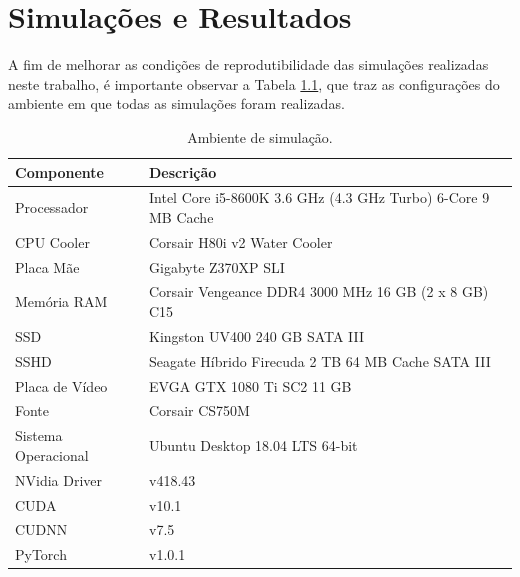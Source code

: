 \chapter{Simulações e Resultados}
\label{cha:results}

A fim de melhorar as condições de reprodutibilidade das simulações realizadas neste trabalho, é importante observar a Tabela \ref{tab:results_pc_specs}, que traz as configurações do ambiente em que todas as simulações foram realizadas.

\begin{table}[H]
    \centering
    \caption{Ambiente de simulação.}
    \begin{tabular}{ll}
        \toprule
        \textbf{Componente} &   \textbf{Descrição}\\
        \midrule
        Processador         &   Intel Core i5-8600K 3.6 GHz (4.3 GHz Turbo) 6-Core 9 MB Cache\\
        \hline
        CPU Cooler          &   Corsair H80i v2 Water Cooler\\
        \hline
        Placa Mãe           &   Gigabyte Z370XP SLI\\
        \hline
        Memória RAM         &   Corsair Vengeance DDR4 3000 MHz 16 GB (2 
        x 8 GB) C15\\
        \hline
        SSD                 &   Kingston UV400 240 GB SATA III\\
        \hline
        SSHD                &   Seagate Híbrido Firecuda 2 TB 64 MB Cache 
        SATA III\\
        \hline
        Placa de Vídeo      &   EVGA GTX 1080 Ti SC2 11 GB\\
        \hline
        Fonte               &   Corsair CS750M\\
        \hline
        Sistema Operacional &   Ubuntu Desktop 18.04 LTS 64-bit\\
        \hline
        NVidia Driver       &   v418.43\\
        \hline
        CUDA                &   v10.1\\
        \hline
        CUDNN               &   v7.5\\
        \hline
        PyTorch             &   v1.0.1\\
        \bottomrule
    \end{tabular}
    \label{tab:results_pc_specs}
\end{table}

